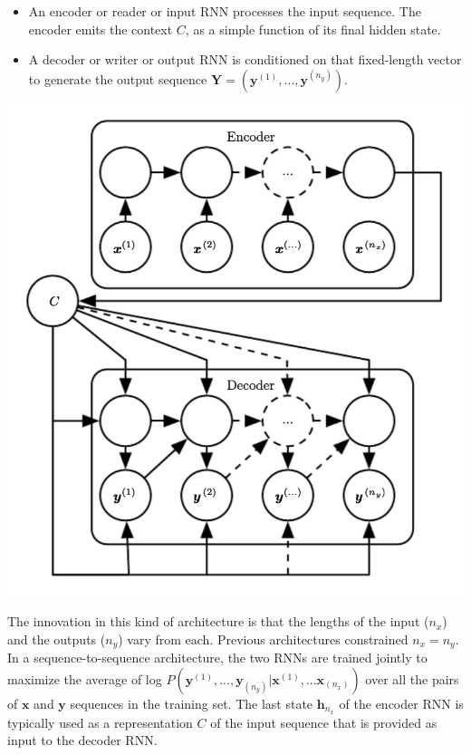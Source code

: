 \documentclass[12pt]{article}
\begin{document}
        \begin{itemize}
            \item An encoder or reader or input RNN processes the input sequence. The encoder emits the context $C$,
            as a simple function of its final hidden state.
            \item A decoder or writer or output RNN is conditioned on that fixed-length vector to generate the output
            sequence $\boldsymbol{Y} = (\boldsymbol{y}^{(1)}, ..., \boldsymbol{y}^{(n_y)})$.
        \end{itemize}

        \begin{center}
            \includegraphics[scale=0.65]{encoder-decoder}
        \end{center}

        The innovation in this kind of architecture is that the lengths of the input ($n_x$) and the outputs ($n_y$)
        vary from each. Previous architectures constrained $n_x = n_y$. In a sequence-to-sequence architecture, the two
        RNNs are trained jointly to maximize the average of log $P(\boldsymbol{y}^{(1)}, ..., \boldsymbol{y}_{(n_y)}|
        \boldsymbol{x}^{(1)}, ... \boldsymbol{x}_{(n_x)})$ over all the pairs of $\boldsymbol{x}$ and $\boldsymbol{y}$
        sequences in the training set. The last state $\boldsymbol{h}_{n_x}$ of the encoder RNN is typically used as a
        representation $C$ of the input sequence that is provided as input to the decoder RNN.
\end{document}
